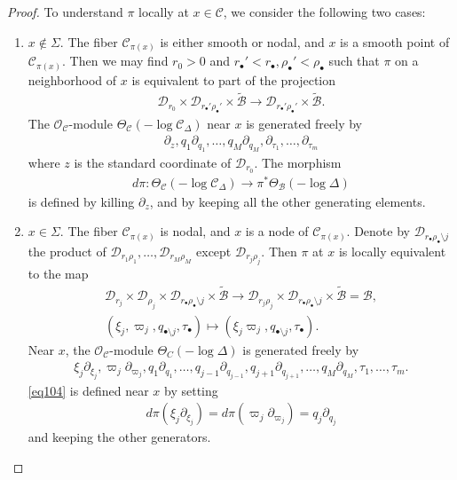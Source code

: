 \documentclass[11pt,b5paper,notitlepage]{article}
\theoremstyle{definition}
\theoremstyle{plain}
\newcommand{\mc}{\mathcal}
\newcommand{\wtd}{\widetilde}
\newcommand{\scr}{\mathscr}
\newcommand{\blt}{\bullet}
\numberwithin{equation}{section}
\begin{document}
\begin{proof}
To understand $\pi$ locally at $x\in\mc C$, we consider the following two cases:
\begin{enumerate}
\item $x\notin\Sigma$. The fiber $\mc C_{\pi(x)}$ is either smooth or nodal, and $x$ is a smooth point of $\mc C_{\pi(x)}$. Then we may find $r_0>0$ and $r_\blt'<r_\blt,\rho_\blt'<\rho_\blt$ such that $\pi$ on a neighborhood of $x$ is equivalent to part of the projection
\begin{align*}
\mc D_{r_0}\times\mc D_{r_\blt'\rho_\blt'}\times\wtd{\mc B}	\rightarrow\mc D_{r_\blt'\rho_\blt'}\times\wtd{\mc B}.
\end{align*}
The $\scr O_{\mc C}$-module $\Theta_{\mc C}(-\log\mc C_\Delta)$ near $x$ is generated freely by
\begin{align*}
\partial_z,q_1\partial_{q_1},\dots,q_M\partial_{q_M},\partial_{\tau_1},\dots,\partial_{\tau_m}	
\end{align*}
where $z$ is the standard coordinate of $\mc D_{r_0}$. The morphism
\begin{align}
	d\pi:\Theta_{\mc C}(-\log\mc C_\Delta)\rightarrow \pi^*\Theta_{\mc B}(-\log\Delta)\label{eq104}
\end{align}
is defined by killing $\partial_z$, and by keeping all the other generating elements.

\item $x\in\Sigma$. The fiber $\mc C_{\pi(x)}$ is nodal, and $x$ is a node of $\mc C_{\pi(x)}$. Denote by $\mc D_{r_\blt\rho_\blt\setminus j}$ the product of $\mc D_{r_1\rho_1},\dots,\mc D_{r_M\rho_M}$ except $\mc D_{r_j\rho_j}$.  Then $\pi$ at $x$ is locally equivalent to the map
\begin{gather*}
\mc D_{r_j}\times\mc D_{\rho_j}\times\mc D_{r_\blt\rho_\blt\setminus j}\times\wtd{\mc B}\rightarrow \mc D_{r_j\rho_j}\times\mc D_{r_\blt\rho_\blt\setminus j}\times\wtd{\mc B}=\mc B,\\
(\xi_j,\varpi_j,q_{\blt\setminus j},\tau_\blt)\mapsto (\xi_j\varpi_j,q_{\blt\setminus j},\tau_\blt).
\end{gather*}
Near $x$, the $\scr O_{\mc C}$-module $\Theta_C(-\log\Delta)$ is generated freely by
\begin{align*}
\xi_j\partial_{\xi_j},\varpi_j\partial_{\varpi_j},q_1\partial_{q_1},\dots,q_{j-1}\partial_{q_{j-1}},q_{j+1}\partial_{q_{j+1}},\dots,q_M\partial_{q_M},\tau_1,\dots,\tau_m.
\end{align*}
\eqref{eq104} is defined near $x$ by setting
\begin{align}
d\pi(\xi_j\partial_{\xi_j})=d\pi(\varpi_j\partial_{\varpi_j})=q_j\partial_{q_j}\label{eq106}
\end{align}
and keeping the other generators.
\end{enumerate}



\end{proof}
\end{document}
